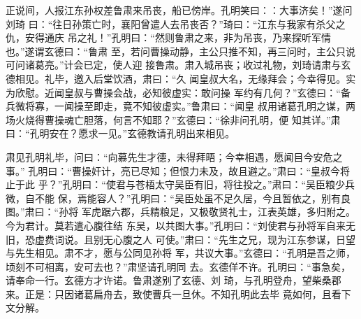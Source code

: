 正说间，人报江东孙权差鲁肃来吊丧，船已傍岸。孔明笑曰：：大事济矣！”遂问刘琦
曰：“往日孙策亡时，襄阳曾遣人去吊丧否？”琦曰：“江东与我家有杀父之仇，安得通庆
吊之礼！”孔明曰：“然则鲁肃之来，非为吊丧，乃来探听军情也。”遂谓玄德曰：“鲁肃
至，若问曹操动静，主公只推不知，再三问时，主公只说可问诸葛亮。”计会已定，使人迎
接鲁肃。肃入城吊丧；收过礼物，刘琦请肃与玄德相见。礼毕，邀入后堂饮酒，肃曰：“久
闻皇叔大名，无缘拜会；今幸得见。实为欣慰。近闻皇叔与曹操会战，必知彼虚实：敢问操
军约有几何？”玄德曰：“备兵微将寡，一闻操至即走，竟不知彼虚实。”鲁肃曰：“闻皇
叔用诸葛孔明之谋，两场火烧得曹操魂亡胆落，何言不知耶？”玄德曰：“徐非问孔明，便
知其详。”肃曰：“孔明安在？愿求一见。”玄德教请孔明出来相见。

肃见孔明礼毕，问曰：“向慕先生才德，未得拜晤；今幸相遇，愿闻目今安危之事。”
孔明曰：“曹操奸计，亮已尽知；但恨力未及，故且避之。”肃曰：“皇叔今将止于此
乎？”孔明曰：“使君与苍梧太守吴臣有旧，将往投之。”肃曰：“吴臣粮少兵微，自不能
保，焉能容人？”孔明曰：“吴臣处虽不足久居，今且暂依之，别有良图。”肃曰：“孙将
军虎踞六郡，兵精粮足，又极敬贤礼士，江表英雄，多归附之。今为君计。莫若遣心腹往结
东吴，以共图大事。”孔明曰：“刘使君与孙将军自来无旧，恐虚费词说。且别无心腹之人
可使。”肃曰：“先生之兄，现为江东参谋，日望与先生相见。肃不才，愿与公同见孙将
军，共议大事。”玄德曰：“孔明是吾之师，顷刻不可相离，安可去也？”肃坚请孔明同
去。玄德佯不许。孔明曰：“事急矣，请奉命一行。玄德方才许诺。鲁肃遂别了玄德、刘
琦，与孔明登舟，望柴桑郡来。正是：只因诸葛扁舟去，致使曹兵一旦休。不知孔明此去毕
竟如何，且看下文分解。